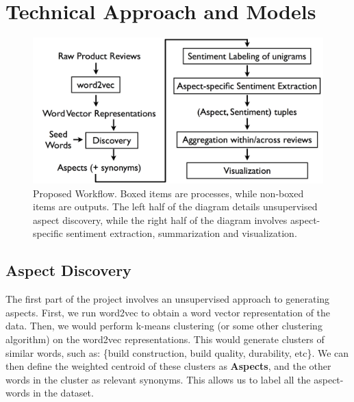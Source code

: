 \documentclass{article} %
\begin{document}
\section{Technical Approach and Models} 

\begin{figure}[h]
\begin{center}
\includegraphics[width=1\columnwidth]{workflow.png}
\end{center}
\caption{Proposed Workflow. Boxed items are processes, while non-boxed items are outputs. The left half of the diagram details unsupervised aspect discovery, while the right half of the diagram involves aspect-specific sentiment extraction, summarization and visualization.}%
\label{workflow}
\end{figure}



\subsection{Aspect Discovery}

The first part of the project involves an unsupervised approach to generating aspects. First, we run word2vec to obtain a word vector representation of the data. Then, we would perform k-means clustering (or some other clustering algorithm) on the word2vec representations. This would generate clusters of similar words, such as: \{build construction, build quality, durability, etc\}. We can then define the weighted centroid of these clusters as {\bf Aspects}, and the other words in the cluster as relevant synonyms. This allows us to label all the aspect-words in the dataset.


\end{document}

